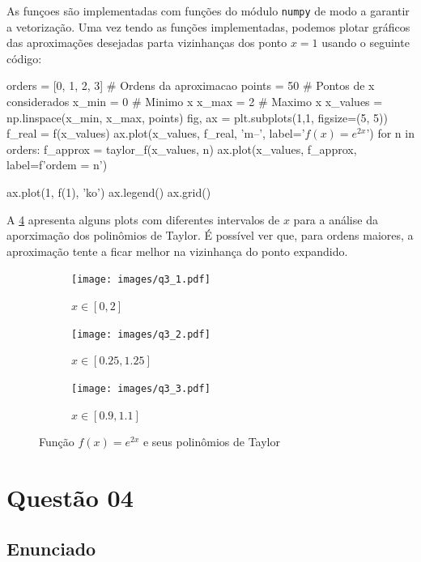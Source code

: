\documentclass[10pt, a4paper]{article}
\begin{document}
As funçoes são implementadas com funções do módulo 
{\tt numpy} de modo a garantir a vetorização. Uma vez tendo as funções implementadas,
podemos plotar gráficos das aproximações desejadas parta vizinhanças dos ponto $x = 1$
usando o seguinte código:

\begin{python}
orders = [0, 1, 2, 3] # Ordens da aproximacao
points = 50 # Pontos de x considerados
x_min = 0 # Minimo x
x_max = 2 # Maximo x
x_values = np.linspace(x_min, x_max, points)
fig, ax = plt.subplots(1,1, figsize=(5, 5))
f_real = f(x_values)
ax.plot(x_values, f_real, 'm--', label='$f(x) = e^{2x}$')
for n in orders:
    f_approx = taylor_f(x_values, n)
    ax.plot(x_values, f_approx, label=f'ordem = {n}')

ax.plot(1, f(1), 'ko')
ax.legend()
ax.grid()
\end{python}

A \cref{fig:q3} apresenta alguns plots com diferentes intervalos de $x$ para a análise
da aporximação dos polinômios de Taylor. É possível ver que, para ordens maiores, a aproximação
tente a ficar melhor na vizinhança do ponto expandido.

\begin{figure}
    \centering
    \begin{subfigure}[b]{0.32\textwidth}
        \centering
        \texttt{[image: images/q3\_1.pdf]}
        \caption{$x \in [0, 2]$}
        \label{fig:q3_1}
    \end{subfigure}
    \hfill
    \begin{subfigure}[b]{0.32\textwidth}
        \centering
        \texttt{[image: images/q3\_2.pdf]}
        \caption{$x \in [0.25, 1.25]$}
        \label{fig:q3_2}
    \end{subfigure}
    \hfill
    \begin{subfigure}[b]{0.32\textwidth}
        \centering
        \texttt{[image: images/q3\_3.pdf]}
        \caption{$x \in [0.9, 1.1]$}
        \label{fig:q3_3}
    \end{subfigure}
       \caption{Função $f(x) = e^{2x}$ e seus polinômios de Taylor}
       \label{fig:q3}
\end{figure}

\newpage

\section{Questão 04}

\subsection{Enunciado}
\end{document}
